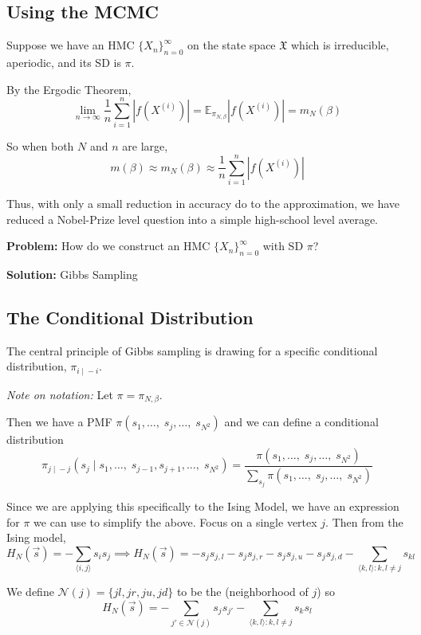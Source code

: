 \documentclass[12pt]{article}
\newcommand{\brak}[1]{\langle #1 \rangle}
\newcommand{\E}{\mathbb{E}}
\newcommand{\mfX}{\mathfrak{X}}
\newcommand{\abs}[1]{\left\vert #1 \right\vert}
\begin{document}
    \subsection{Using the MCMC}
        Suppose we have an HMC $\{X_n\}_{n=0}^\infty$ on the state space $\mfX$ which is irreducible, aperiodic, and its SD is $\pi$. 
        
        By the Ergodic Theorem, 
        \[\lim_{n\to \infty} \frac{1}{n}\sum_{i=1}^n \abs{f(X^{(i)})} = \E_{\pi_{N, \beta}}\abs{f(X^{(i)})} = m_N(\beta)\]

        So when both $N$ and $n$ are large, 
        \[m(\beta) \approx m_N(\beta) \approx \frac{1}{n}\sum_{i=1}^n \abs{f(X^{(i)})}\]

        Thus, with only a small reduction in accuracy do to the approximation, we have reduced a Nobel-Prize level question into a simple high-school level average. 

        \textbf{Problem:} How do we construct an HMC $\{X_n\}_{n=0}^\infty$ with SD $\pi$?

        \textbf{Solution:} Gibbs Sampling 

    \subsection{The Conditional Distribution}
        The central principle of Gibbs sampling is drawing for a specific conditional distribution, $\pi_{i \; | \; -i}$.

        \emph{Note on notation:} Let $\pi = \pi_{N, \beta}$. 

        Then we have a PMF $\pi(s_1, \dots,\; s_j, \dots,\; s_{N^2})$ and we can define a conditional distribution
        \[\pi_{j \; | \; -j}(s_j \; | \; s_1, \dots,\; s_{j-1}, s_{j+1}, \dots,\; s_{N^2}) = \frac{\pi(s_1, \dots,\; s_j, \dots,\; s_{N^2})}{\sum_{s_j} \pi(s_1, \dots,\; s_j, \dots,\; s_{N^2})}\]

        Since we are applying this specifically to the Ising Model, we have an expression for $\pi$ we can use to simplify the above. Focus on a single vertex $j$. Then from the Ising model, 
        \[H_N(\vec s) = -\sum_{\brak{i,j}} s_i s_j \implies H_N(\vec s) = -s_j s_{j, l} - s_j s_{j, r} - s_j s_{j, u} - s_j s_{j, d} - \sum_{\brak{k, l}: k, l \neq j} s_{kl}\]

        We define $\mathcal{N}(j) = \{jl, jr, ju, jd\}$ to be the (neighborhood of $j$) so 
        \[H_N(\vec s) = -\sum_{j' \in \mathcal{N}(j)} s_j s_{j'} - \sum_{\brak{k, l}: k, l \neq j} s_k s_l\]
\end{document}
